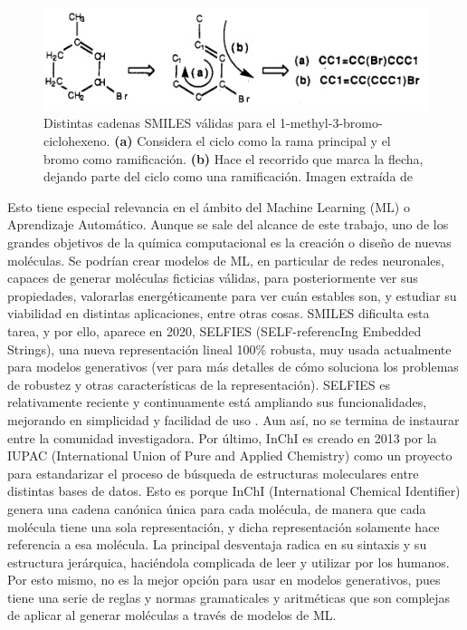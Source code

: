 \begin{figure}[H]
\centering
    \includegraphics[scale=0.4]{imagenes/intro/sinonimos.png}
    \caption{Distintas cadenas SMILES válidas para el 1-methyl-3-bromo-ciclohexeno. \textbf{(a)} Considera el ciclo como la rama principal y el bromo como ramificación. \textbf{(b)} Hace el recorrido que marca la flecha, dejando parte del ciclo como una ramificación. Imagen extraída de \cite{weininger_smiles_1988}}
    \label{fig:sinonimos_smiles}
\end{figure}

Esto tiene especial relevancia en el ámbito del Machine Learning (ML) o Aprendizaje Automático. Aunque se sale del alcance de este trabajo, uno de los grandes objetivos de la química computacional es la creación o diseño de nuevas moléculas. Se podrían crear modelos de ML, en particular de redes neuronales, capaces de generar moléculas ficticias válidas, para posteriormente ver sus propiedades, valorarlas energéticamente para ver cuán estables son, y estudiar su viabilidad en distintas aplicaciones, entre otras cosas. SMILES dificulta esta tarea, y por ello, aparece en 2020, SELFIES (SELF-referencIng Embedded Strings), una nueva representación lineal 100\% robusta, muy usada actualmente para modelos generativos (ver \cite{SELFIES, krenn_self_referencing_2020} para más detalles de cómo soluciona los problemas de robustez y otras características de la representación). SELFIES es relativamente reciente y continuamente está ampliando sus funcionalidades, mejorando en simplicidad y facilidad de uso \cite{selfies_recent_2023}. Aun así, no se termina de instaurar entre la comunidad investigadora. Por último, InChI es creado en 2013 por la IUPAC (International Union of Pure and Applied Chemistry) como un proyecto para estandarizar el proceso de búsqueda de estructuras moleculares entre distintas bases de datos. Esto es porque InChI (International Chemical Identifier) genera una cadena canónica única para cada molécula, de manera que cada molécula tiene una sola representación, y dicha representación solamente hace referencia a esa molécula. La principal desventaja radica en su sintaxis y su estructura jerárquica, haciéndola complicada de leer y utilizar por los humanos. Por esto mismo, no es la mejor opción para usar en modelos generativos, pues tiene una serie de reglas y normas gramaticales y aritméticas que son complejas de aplicar al generar moléculas a través de modelos de ML\cite{heller_inchi_2015}.


